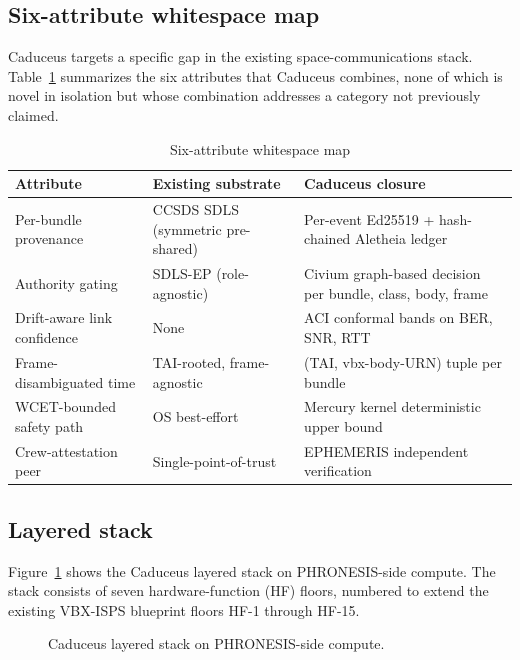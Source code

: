 \documentclass[conference]{IEEEtran}
\begin{document}
\subsection{Six-attribute whitespace map}

Caduceus targets a specific gap in the existing space-communications stack. Table~\ref{tab:whitespace} summarizes the six attributes that Caduceus combines, none of which is novel in isolation but whose combination addresses a category not previously claimed.

\begin{table}[h]
\caption{Six-attribute whitespace map}
\label{tab:whitespace}
\centering
\small
\begin{tabular}{p{2.5cm}p{2.5cm}p{2.5cm}}
\toprule
\textbf{Attribute} & \textbf{Existing substrate} & \textbf{Caduceus closure} \\
\midrule
Per-bundle provenance & CCSDS SDLS (symmetric pre-shared) & Per-event Ed25519 + hash-chained Aletheia ledger \\
Authority gating & SDLS-EP (role-agnostic) & Civium graph-based decision per bundle, class, body, frame \\
Drift-aware link confidence & None & ACI conformal bands on BER, SNR, RTT \\
Frame-disambiguated time & TAI-rooted, frame-agnostic & (TAI, vbx-body-URN) tuple per bundle \\
WCET-bounded safety path & OS best-effort & Mercury kernel deterministic upper bound \\
Crew-attestation peer & Single-point-of-trust & EPHEMERIS independent verification \\
\bottomrule
\end{tabular}
\end{table}

\subsection{Layered stack}

Figure~\ref{fig:stack} shows the Caduceus layered stack on PHRONESIS-side compute. The stack consists of seven hardware-function (HF) floors, numbered to extend the existing VBX-ISPS \cite{wooden2025vbxisps} blueprint floors HF-1 through HF-15.

\begin{figure}[h]
\centering
{}
\caption{Caduceus layered stack on PHRONESIS-side compute.}
\label{fig:stack}
\end{figure}
\end{document}
